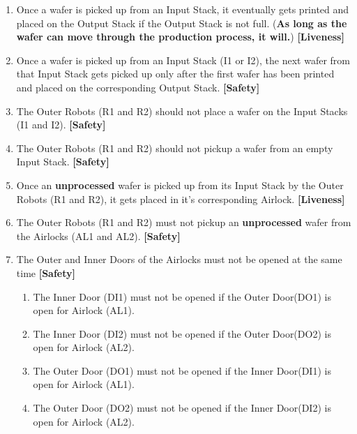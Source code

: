 \documentclass[a4paper,12pt]{article}
\begin{document}
	\begin{enumerate}
		\item Once a wafer is picked up from an Input Stack, it eventually gets printed and placed on the Output Stack if the Output Stack is not full. (\textbf{As long as the wafer can move through the production process, it will.}) \textbf{[Liveness]}
		\item Once a wafer is picked up from an Input Stack (I1 or I2), the next wafer from that Input Stack gets picked up only after the first wafer has been printed and placed on the corresponding Output Stack. \textbf{[Safety]}
		\item The Outer Robots (R1 and R2) should not place a wafer on the Input Stacks (I1 and I2). \textbf{[Safety]}
		\item The Outer Robots (R1 and R2) should not pickup a wafer from an empty Input Stack. \textbf{[Safety]}
		\item Once an \textbf{unprocessed} wafer is picked up from its Input Stack by the Outer Robots (R1 and R2), it gets placed in it's corresponding Airlock. \textbf{[Liveness]}
		\item The Outer Robots (R1 and R2) must not pickup an \textbf{unprocessed} wafer from the Airlocks (AL1 and AL2). \textbf{[Safety]}
		\item The Outer and Inner Doors of the Airlocks must not be opened at the same time \textbf{[Safety]}
		\begin{enumerate}
			\item The Inner Door (DI1) must not be opened if the Outer Door(DO1) is open for Airlock (AL1).
			
			\item The Inner Door (DI2) must not be opened if the Outer Door(DO2) is open for Airlock (AL2).
			
			\item The Outer Door (DO1) must not be opened if the Inner Door(DI1) is open for Airlock (AL1).
			
			\item The Outer Door (DO2) must not be opened if the Inner Door(DI2) is open for Airlock (AL2).
			

\end{enumerate}
\end{enumerate}
\end{document}
